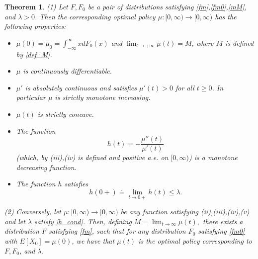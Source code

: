 \documentclass{article}
\newtheorem{thm}{Theorem}[section]
\numberwithin{equation}{section}
\begin{document}
	\begin{thm}\label{char}
		(1) Let $F,F_0$ be a pair of distributions satisfying \eqref{fm},\eqref{fm0},\eqref{mM}, and $\lambda>0$.
		Then the corresponding optimal policy $\mu: [0,\infty)\rightarrow [0,\infty)$ has the following properties:
		\begin{itemize}
			\item[(i)] $\mu(0)=\mu_0=\int_{-\infty}^\infty xdF_0(x)$ and  $\lim_{t\rightarrow +\infty}\mu(t)=M$, where $M$ is defined by
			\eqref{def_M}.
			
			\item[(ii)] $\mu$ is continuously differentiable.
			
			\item[(iii)] $\mu'$ is absolutely continuous and satisfies $\mu'(t)>0$ for all $t\geq 0$. In particular $\mu$ is strictly monotone increasing.
			
			\item[(iv)] $\mu(t)$ is strictly concave.
			
			\item[(v)] The function \begin{equation}\label{def_h}h(t)=-\frac{\mu''(t)}{\mu'(t)}
			\end{equation}
			(which, by (iii),(iv) is defined and positive {\it{a.e.}} on $[0,\infty)$) is a monotone decreasing function.
			
			\item[(vi)] The function $h$ satisfies
			\begin{equation}\label{h_cond}h(0+)\doteq\lim_{t\rightarrow 0+}h(t)\leq \lambda.
			\end{equation}
		\end{itemize}
		
		(2) Conversely, let $\mu:[0,\infty)\rightarrow [0,\infty)$ be any function
		satisfying (ii),(iii),(iv),(v) and let $\lambda$ satisfy \eqref{h_cond}.  Then, defining
		$M=\lim_{t\rightarrow \infty}\mu(t),$ there 
		exists a distribution $F$ satisfying 
		\eqref{fm}, such that for any distribution $F_0$ satisfying \eqref{fm0} with $E[X_0]=\mu(0)$, we have that 
		$\mu(t)$ is the optimal policy corresponding to $F,F_0$, and $\lambda$.
	\end{thm}
	
\end{document}
